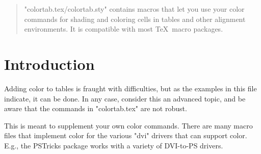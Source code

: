 \renewcommand{\EveryVerbatimLine}[2]{}

\renewcommand{\EveryVerbOutLine}[2]{}

\newcommand{\BeginExample}{%
  \VerbatimEnvironment\begin{VerbatimOut}{\jobname.tmp}}

\newcommand{\EndExample}{%
  \end{VerbatimOut}%
  \renewcommand{\EveryVerbatimLine}{}%
  \renewcommand{\EveryVerbatimCodes}{\catcode`\"=14}%
  \LVerbatimInput{\jobname.tmp}%
  \catcode`\"=9}

%
  {}

\if@test

\newenvironment{example}{\BeginExample}{\EndExample
  \begin{center}\leavevmode\end{center}}

\else

\newenvironment{example}{\VerbatimEnvironment\LVerbatim}{\endLVerbatim}

\fi

\makeatother



\maketitle

\begin{quote}
"colortab.tex/colortab.sty" contains macros that let you use your color
commands for shading and coloring cells in tables and other alignment
environments. It is compatible with most \TeX\ macro packages.
\end{quote}

\tableofcontents

\section{Introduction}

Adding color to tables is fraught with difficulties, but as the examples in
this file indicate, it can be done. In any case, consider this an advanced
topic, and be aware that the commands in "colortab.tex" are not robust.

This is meant to supplement your own color commands. There are many macro
files that implement color for the various "dvi" drivers that can support
color. E.g., the PSTricks package works with a variety of DVI-to-PS drivers.

